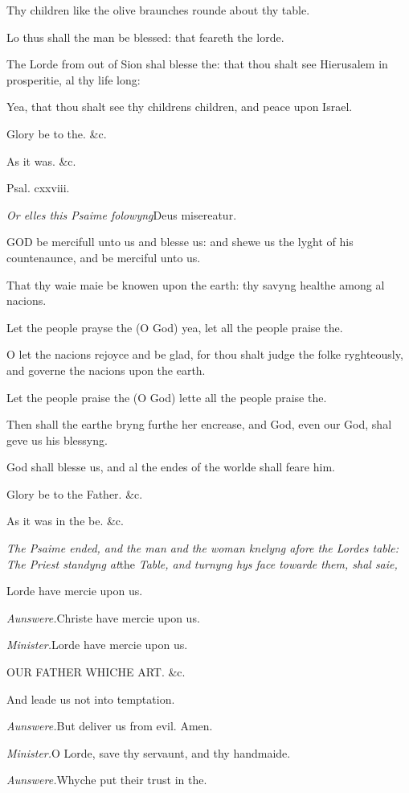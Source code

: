 Thy children like the olive braunches rounde about
thy table.

Lo thus shall the man be blessed: that feareth the
lorde.

The Lorde from out of Sion shal blesse the: that thou
shalt see Hierusalem in prosperitie, al thy life long:

Yea, that thou shalt see thy childrens children, and
peace upon Israel.

Glory be to the. \&c.

As it was. \&c.

Psal.
cxxviii.

\emph{Or
elles this Psaime folowyng}Deus misereatur.

GOD
be mercifull unto us and blesse us: and shewe us the lyght of his countenaunce,
and be merciful unto us.

That thy waie maie be knowen upon the earth: thy savyng
healthe among al nacions.

Let the people prayse the (O God) yea, let all the
people praise the.

O let the nacions rejoyce and be glad, for thou shalt
judge the folke ryghteously, and governe the nacions upon the earth.

Let the people praise the (O God) lette all the people
praise the.

Then shall the earthe bryng furthe her encrease, and
God, even our God, shal geve us his blessyng.

God shall blesse us, and al the endes of the worlde
shall feare him.

Glory be to the Father. \&c.

As it was in the be. \&c.

\emph{The
Psaime ended, and the man and} \emph{the woman knelyng afore the Lordes
table: The Priest standyng at}the \emph{Table, and turnyng hys face
towarde them, shal saie,}

Lorde have mercie upon us.

\emph{Aunswere.}Christe have mercie upon us.

\emph{Minister.}Lorde have mercie upon us.

OUR
FATHER WHICHE ART. \&c.

And leade us not into temptation.

\emph{Aunswere.}But deliver us from evil. Amen.

\emph{Minister.}O Lorde, save thy servaunt, and thy
handmaide.

\emph{Aunswere.}Whyche put their trust in the.

